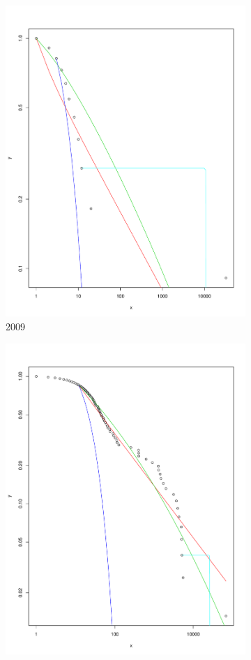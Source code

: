 \documentclass[preprint,12pt]{elsarticle}
\begin{document}
\begin{figure}[H]
\centering
\begin{subfigure}{.3\textwidth}
  \centering
  \includegraphics[width=.8\linewidth]{Bitcoin-graphs/degree-dist-out-2009.pdf}  
  \caption{2009}
  \label{fig:2009o}
\end{subfigure}
\begin{subfigure}{.3\textwidth}
  \centering
  \includegraphics[width=.8\linewidth]{Bitcoin-graphs/deg-dist-2010-out.pdf}  

\end{subfigure}
\end{figure}
\end{document}
